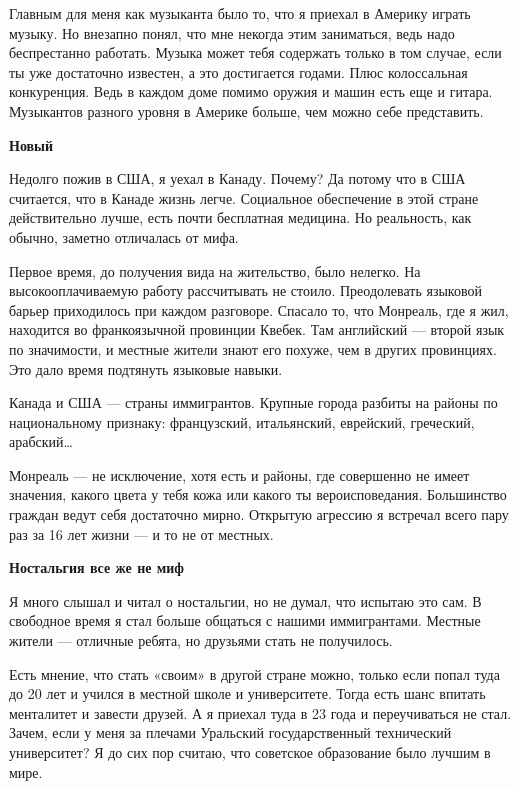 Главным для меня как музыканта было то, что я приехал в Америку играть музыку. Но внезапно понял, что мне некогда этим заниматься, ведь надо беспрестанно работать. Музыка может тебя содержать только в том случае, если ты уже достаточно известен, а это достигается годами. Плюс колоссальная конкуренция. Ведь в каждом доме помимо оружия и машин есть еще и гитара. Музыкантов разного уровня в Америке больше, чем можно себе представить.

\textbf{Новый }

Недолго пожив в США, я уехал в Канаду. Почему? Да потому что в США считается, что в Канаде жизнь легче. Социальное обеспечение в этой стране действительно лучше, есть почти бесплатная медицина. Но реальность, как обычно, заметно отличалась от мифа.

Первое время, до получения вида на жительство, было нелегко. На высокооплачиваемую работу рассчитывать не стоило. Преодолевать языковой барьер приходилось при каждом разговоре. Спасало то, что Монреаль, где я жил, находится во франкоязычной провинции Квебек. Там английский — второй язык по значимости, и местные жители знают его похуже, чем в других провинциях. Это дало время подтянуть языковые навыки.

\begin{fancyquotes}
    Канада и США — страны иммигрантов. Крупные города разбиты на районы по национальному признаку: французский, итальянский, еврейский, греческий, арабский…
\end{fancyquotes}

Монреаль — не исключение, хотя есть и районы, где совершенно не имеет значения, какого цвета у тебя кожа или какого ты вероисповедания. Большинство граждан ведут себя достаточно мирно. Открытую агрессию я встречал всего пару раз за 16 лет жизни — и то не от местных.


\textbf{Ностальгия все же не миф}

Я много слышал и читал о ностальгии, но не думал, что испытаю это сам. В свободное время я стал больше общаться с нашими иммигрантами. Местные жители — отличные ребята, но друзьями стать не получилось.

Есть мнение, что стать «своим» в другой стране можно, только если попал туда до 20 лет и учился в местной школе и университете. Тогда есть шанс впитать менталитет и завести друзей. А я приехал туда в 23 года и переучиваться не стал. Зачем, если у меня за плечами Уральский государственный технический университет? Я до сих пор считаю, что советское образование было лучшим в мире.

